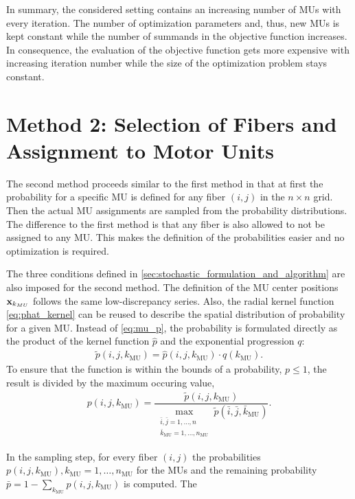 In summary, the considered setting contains an increasing number of MUs with every iteration. The number of optimization parameters and, thus, new MUs is kept constant while the number of summands in the objective function increases. In consequence, the evaluation of the objective function gets more expensive with increasing iteration number while the size of the optimization problem stays constant.

\section{Method 2: Selection of Fibers and Assignment to Motor Units}

The second method proceeds similar to the first method in that at first the probability for a specific MU is defined for any fiber $(i,j)$ in the $n \times n$ grid. Then the actual MU assignments are sampled from the probability distributions. The difference to the first method is that any fiber is also allowed to not be assigned to any MU. This makes the definition of the probabilities easier and no optimization is required.

The three conditions defined in \cref{sec:stochastic_formulation_and_algorithm} are also imposed for the second method. The definition of the MU center positions $\textbf{x}_{k_{MU}}$ follows the same low-discrepancy series. Also, the radial kernel function \cref{eq:phat_kernel} can be reused to describe the spatial distribution of probability for a given MU. Instead of \cref{eq:mu_p}, the probability is formulated directly as the product of the kernel function $\hat{p}$ and the exponential progression $q$:
\begin{align*}
  \tilde{p}(i,j,k_\text{MU}) = \hat{p}(i,j,k_\text{MU}) \cdot q(k_\text{MU}).
\end{align*}
%
To ensure that the function is within the bounds of a probability, $p \leq 1$, the result is divided by the maximum occuring value,%
\begin{align*}
  p(i,j,k_\text{MU}) = \dfrac{\tilde{p}(i,j,k_\text{MU})}{\max\limits_{\substack{\bar{i},\bar{j} = 1,\dots,n\\\bar{k}_\text{MU}=1,\dots,n_\text{MU}}} \tilde{p}(\bar{i},\bar{j},\bar{k}_\text{MU})}.
\end{align*}
%

In the sampling step, for every fiber $(i,j)$ the probabilities $p(i,j,k_\text{MU}), k_\text{MU}=1,\dots,n_\text{MU}$ for the MUs and the remaining probability $\bar{p} = 1-\sum_{k_\text{MU}} p(i,j,k_\text{MU})$ is computed. The 

